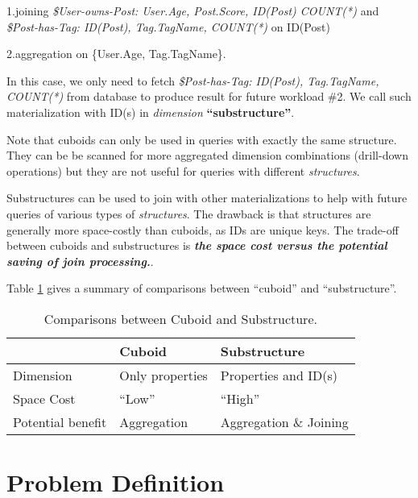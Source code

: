 1.joining \textit{\$User-owns-Post: User.Age, Post.Score, ID(Post) COUNT(*)} and \textit{\$Post-has-Tag: ID(Post), Tag.TagName, COUNT(*)} on ID(Post)

2.aggregation on \{User.Age, Tag.TagName\}. 

In this case, we only need to fetch \textit{\$Post-has-Tag: ID(Post), Tag.TagName, COUNT(*)} from database to produce result for future workload \#2. We call such materialization with ID(s) in \textit{dimension} \textbf{``substructure''}. 

Note that cuboids can only be used in queries with exactly the same structure. They can be be scanned for more aggregated dimension combinations (drill-down operations) but they are not useful for queries with different \textit{structures}. 

Substructures can be used to join with other materializations to help with future queries of various types of \textit{structures}.
The drawback is that structures are generally more space-costly than cuboids, as IDs are unique keys. The trade-off between cuboids and substructures is \textbf{\textit{the space cost versus the potential saving of join processing.}}.

Table \ref{Table:3:1} gives a summary of comparisons between ``cuboid'' and ``substructure''. 

\begin{table}
	\footnotesize
	\begin {center}
	\begin{tabular}{ | l | l | l |}
		\hline
		&Cuboid&Substructure\\ \hline
		Dimension& Only properties& Properties and ID(s)\\ \hline
		Space Cost& ``Low''&``High''\\ \hline
		Potential benefit& Aggregation& Aggregation \& Joining\\ \hline
	\end{tabular}
	\end {center}
	\caption{Comparisons between Cuboid and Substructure.}
	\label{Table:3:1}
\end{table}


\section{Problem Definition}
\label{sec:Problem Definition}

